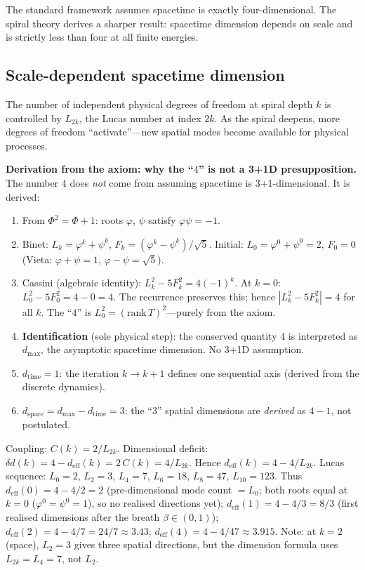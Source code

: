 \documentclass[12pt,a4paper]{article}
\begin{document}
The standard framework assumes spacetime is exactly four-dimensional. The spiral theory derives a sharper result: spacetime dimension depends on scale and is strictly less than four at all finite energies.

\subsection{Scale-dependent spacetime dimension}
\label{sec:dim-fundamental}

The number of independent physical degrees of freedom at spiral depth $k$ is controlled by $L_{2k}$, the Lucas number at index $2k$. As the spiral deepens, more degrees of freedom ``activate''---new spatial modes become available for physical processes.

\medskip
\noindent\textbf{Derivation from the axiom: why the ``$4$'' is not a 3+1D presupposition.}
The number 4 does \emph{not} come from assuming spacetime is 3+1-dimensional. It is derived:
\begin{enumerate}[nosep]
\item From $\Phi^2 = \Phi + 1$: roots $\varphi$, $\psi$ satisfy $\varphi\psi = -1$.
\item Binet: $L_k = \varphi^k + \psi^k$, $F_k = (\varphi^k - \psi^k)/\sqrt{5}$. Initial: $L_0 = \varphi^0 + \psi^0 = 2$, $F_0 = 0$ (Vieta: $\varphi + \psi = 1$, $\varphi - \psi = \sqrt{5}$).
\item Cassini (algebraic identity): $L_k^2 - 5F_k^2 = 4(-1)^k$. At $k=0$: $L_0^2 - 5F_0^2 = 4 - 0 = 4$. The recurrence preserves this; hence $|L_k^2 - 5F_k^2| = 4$ for all $k$. The ``$4$'' is $L_0^2 = (\mathrm{rank}\,T)^2$---purely from the axiom.
\item \textbf{Identification} (sole physical step): the conserved quantity 4 is interpreted as $d_{\max}$, the asymptotic spacetime dimension. No 3+1D assumption.
\item $d_{\mathrm{time}} = 1$: the iteration $k \to k+1$ defines one sequential axis (derived from the discrete dynamics).
\item $d_{\mathrm{space}} = d_{\max} - d_{\mathrm{time}} = 3$: the ``3'' spatial dimensions are \emph{derived} as $4 - 1$, not postulated.
\end{enumerate}
Coupling: $C(k) = 2/L_{2k}$. Dimensional deficit: $\delta d(k) = 4 - d_{\mathrm{eff}}(k) = 2\,C(k) = 4/L_{2k}$. Hence $d_{\mathrm{eff}}(k) = 4 - 4/L_{2k}$. Lucas sequence: $L_0=2$, $L_2=3$, $L_4=7$, $L_6=18$, $L_8=47$, $L_{10}=123$. Thus $d_{\mathrm{eff}}(0) = 4 - 4/2 = 2$ (pre-dimensional mode count $= L_0$; both roots equal at $k=0$ ($\varphi^0 = \psi^0 = 1$), so no realised directions yet); $d_{\mathrm{eff}}(1) = 4 - 4/3 = 8/3$ (first realised dimensions after the breath $\beta \in (0,1)$); $d_{\mathrm{eff}}(2) = 4 - 4/7 = 24/7 \approx 3.43$; $d_{\mathrm{eff}}(4) = 4 - 4/47 \approx 3.915$. Note: at $k=2$ (space), $L_2=3$ gives three spatial directions, but the dimension formula uses $L_{2k}=L_4=7$, not $L_2$.
\end{document}
